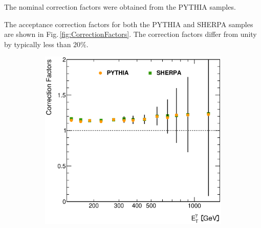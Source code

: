 \documentclass[12pt, twoside]{article}
\numberwithin{equation}{section}
\numberwithin{figure}{section}
\newenvironment{changemargin}[2]{%
\begin{list}{}{%
\setlength{\topsep}{0pt}%
\setlength{\leftmargin}{#1}%
\setlength{\rightmargin}{#2}%
\setlength{\listparindent}{\parindent}%
\setlength{\itemindent}{\parindent}%
\setlength{\parsep}{\parskip}%
}%
\item[]}{\end{list}}
\begin{document}
The nominal correction factors were obtained from the PYTHIA samples.

The acceptance correction factors for both the PYTHIA and SHERPA samples are shown in Fig.\,\ref{fig:CorrectionFactors}. The correction factors differ from unity by typically less than $20 \%$.
\begin{figure}
    \centering
    \checkoddpage
    \ifoddpage
        \begin{changemargin}{-1.0cm}{-0.75cm}
    \else
        \begin{changemargin}{-0.75cm}{-1.0cm}
    \fi
        \begin{subfigure}[b]{0.37\textwidth}
            \includegraphics[width=\textwidth]{./images/CorrectionFactors/CORR_FACT-101.eps}
            \subcaption{}
            \label{fig:CorrectionFactorEtPhoton}
        \end{subfigure}
        \begin{subfigure}[b]{0.37\textwidth}

\end{subfigure}
\end{changemargin}
\end{changemargin}
\end{figure}
\end{document}
